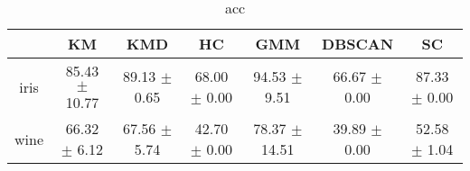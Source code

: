 \begin{table}
\centering
\begin{tabular}{ccccccc}
\toprule
 & KM & KMD & HC & GMM & DBSCAN & SC \\
\midrule
iris & 85.43 $\pm$ 10.77 & 89.13 $\pm$ 0.65 & 68.00 $\pm$ 0.00 & 94.53 $\pm$ 9.51 & 66.67 $\pm$ 0.00 & 87.33 $\pm$ 0.00 \\
wine & 66.32 $\pm$ 6.12 & 67.56 $\pm$ 5.74 & 42.70 $\pm$ 0.00 & 78.37 $\pm$ 14.51 & 39.89 $\pm$ 0.00 & 52.58 $\pm$ 1.04 \\
\bottomrule
\end{tabular}
\caption{acc}
\label{table:acc}
\end{table}

